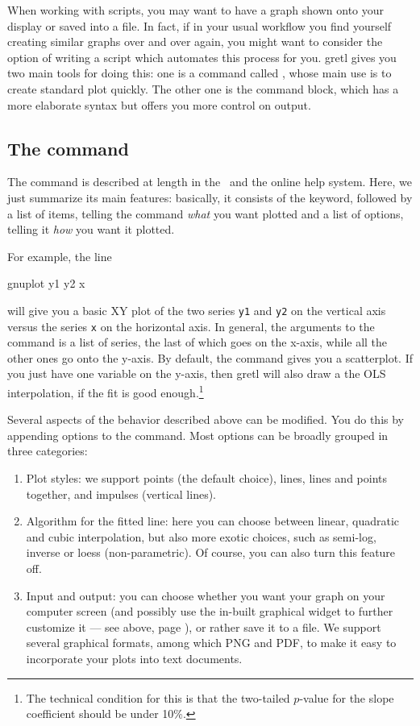 When working with scripts, you may want to have a graph shown onto
your display or saved into a file. In fact, if in your usual workflow
you find yourself creating similar graphs over and over again, you
might want to consider the option of writing a script which automates
this process for you. gretl gives you two main tools for doing
this: one is a command called , whose main use is to
create standard plot quickly. The other one is the  command
block, which has a more elaborate syntax but offers you more control
on output.

\subsection{The  command}
\label{sec:gnuplot-cmd}

The  command is described at length in the \GCR\ and the
online help system. Here, we just summarize its main features:
basically, it consists of the  keyword, followed by a
list of items, telling the command \emph{what} you want plotted and a
list of options, telling it \emph{how} you want it plotted.

For example, the line
\begin{code}
gnuplot y1 y2 x   
\end{code}
will give you a basic XY plot of the two series \texttt{y1} and
\texttt{y2} on the vertical axis versus the series \texttt{x} on the
horizontal axis. In general, the arguments to the 
command is a list of series, the last of which goes on the x-axis,
while all the other ones go onto the y-axis. By default, the
 command gives you a scatterplot. If you just have one
variable on the y-axis, then gretl will also draw a the OLS
interpolation, if the fit is good enough.\footnote{The technical
  condition for this is that the two-tailed $p$-value for the slope
  coefficient should be under 10\%.}

Several aspects of the behavior described above can be modified. You
do this by appending options to the command. Most options can be
broadly grouped in three categories:
\begin{enumerate}
\item Plot styles: we support points (the default choice), lines,
  lines and points together, and impulses (vertical lines). 
\item Algorithm for the fitted line: here you can choose between
  linear, quadratic and cubic interpolation, but also more exotic
  choices, such as semi-log, inverse or loess (non-parametric). Of
  course, you can also turn this feature off.
\item Input and output: you can choose whether you want your graph on
  your computer screen (and possibly use the in-built graphical widget
  to further customize it --- see above, page \pageref{plot-editor}),
  or rather save it to a file. We support several graphical formats,
  among which PNG and PDF, to make it easy to incorporate your
  plots into text documents.
\end{enumerate}

